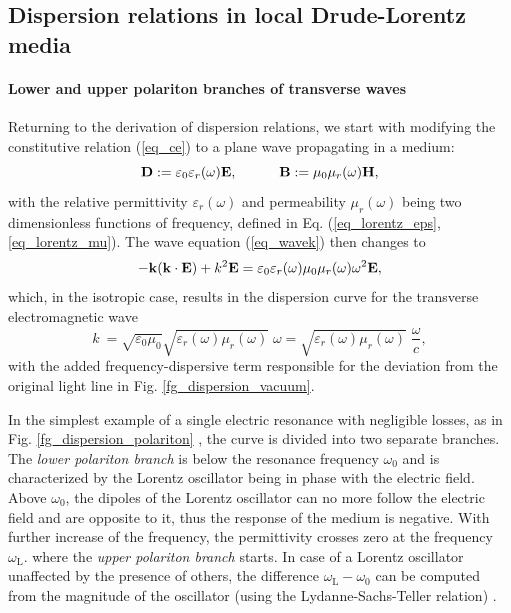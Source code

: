 \subsection{Dispersion relations in local Drude-Lorentz media} \label{disp_rel_local_media}
\paragraph{Lower and upper polariton branches of transverse waves}  %
Returning to the derivation of dispersion relations, we start with modifying the constitutive relation (\ref{eq_ce}) to a plane wave propagating in a medium:
\begin{equation}		\mathbf{D} := \varepsilon_0\varepsilon_r(\omega)	\mathbf{E}, \quad\quad\quad						\mathbf{B} := \mu_0\mu_r(\omega)		\mathbf{H},				 \label{eq_ce2}\end{equation}
with the relative permittivity $\varepsilon_r(\omega)$ and permeability $\mu_r(\omega)$ being two dimensionless functions of frequency, defined in Eq. (\ref{eq_lorentz_eps}, \ref{eq_lorentz_mu}). 
The wave equation (\ref{eq_wavek}) then changes to
\begin{equation} - {\mathbf{k}} ({\mathbf{k}} \cdot \mathbf{E}) + k^2 \mathbf{E} = \varepsilon_0 \varepsilon_r(\omega) \mu_0 \mu_r(\omega) \omega^{2} \mathbf{E}, \label{eq_wavek_disp} \end{equation}
which, in the isotropic case, results in the dispersion curve for the transverse electromagnetic wave 
\begin{equation} k~= \sqrt{\varepsilon_0 \mu_0} \sqrt{\varepsilon_{r}(\omega) \mu_{r}(\omega)}\;\omega = \sqrt{\varepsilon_{r}(\omega) \mu_{r}(\omega)}\; \frac{\omega}{c}, \label{eq_dispeq_vac}\end{equation}
with the added frequency-dispersive term responsible for the deviation from the original light line in Fig. \ref{fg_dispersion_vacuum}. 

In the simplest example of a single electric resonance with negligible losses, as in Fig. \ref{fg_dispersion_polariton} %
, the curve is divided into two separate branches. The \textit{lower polariton branch} is below the resonance frequency $\omega_0$ and is characterized by the Lorentz oscillator being in phase with the electric field. Above $\omega_0$, the dipoles of the Lorentz oscillator can no more follow the electric field and are opposite to it, thus the response of the medium is negative. With further increase of the frequency, the permittivity crosses zero at the frequency $\omega_{\text{L}}$. %
where the \textit{upper polariton branch} starts. In case of a Lorentz oscillator unaffected by the presence of others, the difference $\omega_{\text{L}} - \omega_0$ can be computed from the magnitude of the oscillator (using the Lydanne-Sachs-Teller relation) \cite{klingshirn2007semiconductor}.

